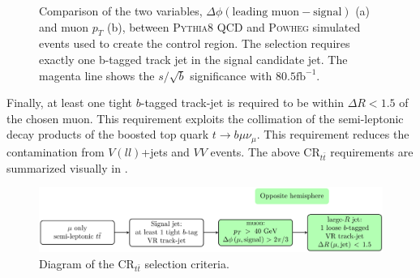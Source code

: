 \begin{figure}[!htbp]
\centering
{}\hfill
{}
\caption{Comparison of the two variables, $\Delta \phi(\text{leading muon}-\text{signal})$ (a) and muon $p_{T}$ (b), between \textsc{Pythia}8 QCD and \textsc{Powheg} \ttbar simulated events used to create the \ttbar control region. The selection requires exactly one b-tagged track jet in the signal candidate \largeR jet. The magenta line shows the $s/\sqrt{b}$ significance with $80.5 \text{fb}^{-1}$.}
\label{sec:background:qcd_rejection_studies}
\end{figure}

Finally, at least one tight $b$-tagged track-jet is required to be within
$\Delta R < 1.5$ of the chosen muon.  This requirement exploits the collimation
of the semi-leptonic decay products of the boosted top quark $t \rightarrow
b\mu\nu_{\mu}$.  This requirement reduces the contamination from $V(ll)$+jets
and $VV$ events. The above $\text{CR}_{t\bar{t}}$ requirements are summarized visually in .

\begin{figure}[!htbp]
\centering
\includegraphics[width=1.0\linewidth]{figures/backgrounds/ttbar_selection}
\caption{\cite {Feickert:2690521} Diagram of the $\text{CR}_{t\bar{t}}$ selection criteria.}
\label{sec:background:ttbar_selection_diagram}
\end{figure}

